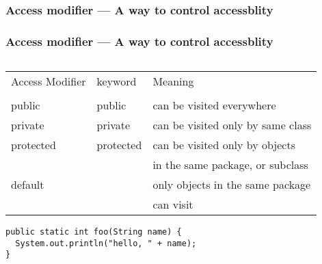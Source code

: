 \documentclass[en, 11pt, xcolor=dvipsnames]{beamer}
\begin{document}
\subsubsection{Access modifier --- A way to control accessblity}
\begin{frame}[fragile]
	\frametitle{Access modifier --- A way to control accessblity}


	\begin{columns}[c]
		\begin{column}{0.9\textwidth}

			\begin{table}
				\begin{center}
					\begin{tabular}[c]{l l l}
						Access Modifier & keyword   & Meaning                           \\ \\
						public          & public    & can be visited everywhere         \\
						private         & private   & can be visited only by same class \\
						protected       & protected & can be visited only by objects    \\
						                &           & in the same package, or subclass  \\
						default         &           & only objects in the same package  \\
						                &           & can visit                         \\
					\end{tabular}
				\end{center}
			\end{table}

			\begin{lstlisting}[style=Java]
public static int foo(String name) {
  System.out.println("hello, " + name);
}
      \end{lstlisting}
		\end{column}
	\end{columns}

\end{frame}
\end{document}
